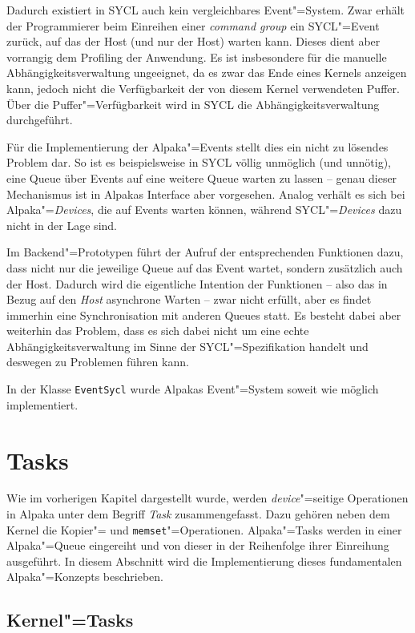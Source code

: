Dadurch existiert in SYCL auch kein vergleichbares Event"=System. Zwar erhält
der Programmierer beim Einreihen einer \textit{command group} ein SYCL"=Event
zurück, auf das der Host (und nur der Host) warten kann. Dieses dient aber
vorrangig dem Profiling der Anwendung. Es ist insbesondere für die manuelle
Abhängigkeitsverwaltung ungeeignet, da es zwar das Ende eines Kernels anzeigen
kann, jedoch nicht die Verfügbarkeit der von diesem Kernel verwendeten Puffer.
Über die Puffer"=Verfügbarkeit wird in SYCL die Abhängigkeitsverwaltung
durchgeführt.

Für die Implementierung der Alpaka"=Events stellt dies ein nicht zu lösendes
Problem dar. So ist es beispielsweise in SYCL völlig unmöglich (und unnötig),
eine Queue über Events auf eine weitere Queue warten zu lassen -- genau dieser
Mechanismus ist in Alpakas Interface aber vorgesehen. Analog verhält es sich bei
Alpaka"=\textit{Devices}, die auf Events warten können, während
SYCL"=\textit{Devices} dazu nicht in der Lage sind.

Im Backend"=Prototypen führt der Aufruf der entsprechenden Funktionen dazu, dass
nicht nur die jeweilige Queue auf das Event wartet, sondern zusätzlich auch der
Host. Dadurch wird die eigentliche Intention der Funktionen -- also das in Bezug
auf den \textit{Host} asynchrone Warten -- zwar nicht erfüllt, aber es findet
immerhin eine Synchronisation mit anderen Queues statt. Es besteht dabei aber
weiterhin das Problem, dass es sich dabei nicht um eine echte
Abhängigkeitsverwaltung im Sinne der SYCL"=Spezifikation handelt und deswegen zu
Problemen führen kann.

In der Klasse \texttt{EventSycl} wurde Alpakas Event"=System soweit wie möglich
implementiert.

\section{Tasks}
\label{implementierung:task}

Wie im vorherigen Kapitel dargestellt wurde, werden \textit{device}"=seitige
Operationen in Alpaka unter dem Begriff \textit{Task} zusammengefasst. Dazu
gehören neben dem Kernel die Kopier"= und \texttt{memset}"=Operationen.
Alpaka"=Tasks werden in einer Alpaka"=Queue eingereiht und von dieser in der
Reihenfolge ihrer Einreihung ausgeführt. In diesem Abschnitt wird die
Implementierung dieses fundamentalen Alpaka"=Konzepts beschrieben.

\subsection{Kernel"=Tasks}
\label{implementierung:task:kernel}

